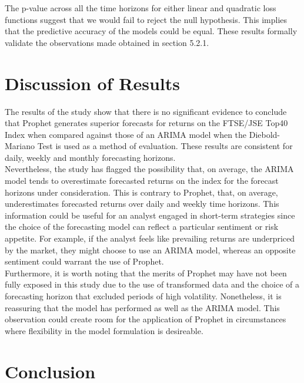 \documentclass[12pt,a4paper]{article}
\numberwithin{equation}{section}
\numberwithin{figure}{section}
\numberwithin{table}{section}
\begin{document}
The p-value across all the time horizons for either linear and quadratic
loss functions suggest that we would fail to reject the null hypothesis.
This implies that the predictive accuracy of the models could be equal.
These results formally validate the observations made obtained in
section 5.2.1.

\section{Discussion of Results}\label{discussion-of-results}

The results of the study show that there is no significant evidence to
conclude that Prophet generates superior forecasts for returns on the
FTSE/JSE Top40 Index when compared against those of an ARIMA model when
the Diebold-Mariano Test is used as a method of evaluation. These
results are consistent for daily, weekly and monthly forecasting
horizons.\\
Nevertheless, the study has flagged the possibility that, on average,
the ARIMA model tends to overestimate forecasted returns on the index
for the forecast horizons under consideration. This is contrary to
Prophet, that, on average, underestimates forecasted returns over daily
and weekly time horizons. This information could be useful for an
analyst engaged in short-term strategies since the choice of the
forecasting model can reflect a particular sentiment or risk appetite.
For example, if the analyst feels like prevailing returns are
underpriced by the market, they might choose to use an ARIMA model,
whereas an opposite sentiment could warrant the use of Prophet.\\
Furthermore, it is worth noting that the merits of Prophet may have not
been fully exposed in this study due to the use of transformed data and
the choice of a forecasting horizon that excluded periods of high
volatility. Nonetheless, it is reassuring that the model has performed
as well as the ARIMA model. This observation could create room for the
application of Prophet in circumstances where flexibility in the model
formulation is desireable.

\section{Conclusion}\label{conclusion}
\end{document}
